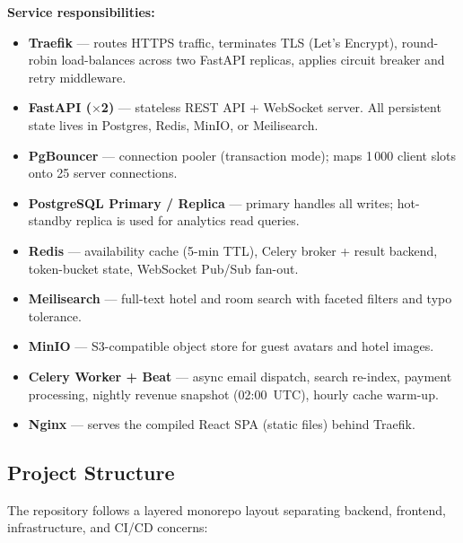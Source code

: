 \documentclass[12pt,a4paper]{article}
\begin{document}
\textbf{Service responsibilities:}
\begin{itemize}[noitemsep]
  \item \textbf{Traefik} --- routes HTTPS traffic, terminates TLS (Let's Encrypt), round-robin load-balances across two FastAPI replicas, applies circuit breaker and retry middleware.
  \item \textbf{FastAPI ($\times$2)} --- stateless REST API + WebSocket server. All persistent state lives in Postgres, Redis, MinIO, or Meilisearch.
  \item \textbf{PgBouncer} --- connection pooler (transaction mode); maps 1\,000 client slots onto 25 server connections.
  \item \textbf{PostgreSQL Primary / Replica} --- primary handles all writes; hot-standby replica is used for analytics read queries.
  \item \textbf{Redis} --- availability cache (5-min TTL), Celery broker + result backend, token-bucket state, WebSocket Pub/Sub fan-out.
  \item \textbf{Meilisearch} --- full-text hotel and room search with faceted filters and typo tolerance.
  \item \textbf{MinIO} --- S3-compatible object store for guest avatars and hotel images.
  \item \textbf{Celery Worker + Beat} --- async email dispatch, search re-index, payment processing, nightly revenue snapshot (02:00~UTC), hourly cache warm-up.
  \item \textbf{Nginx} --- serves the compiled React SPA (static files) behind Traefik.
\end{itemize}

\clearpage
\subsection{Project Structure}

The repository follows a layered monorepo layout separating backend, frontend, infrastructure, and CI/CD concerns:
\end{document}

